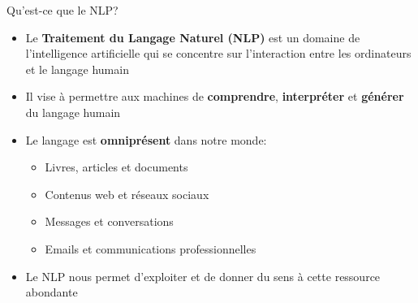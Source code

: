 \documentclass[aspectratio=169,11pt]{beamer}
\begin{document}
\begin{frame}{Qu'est-ce que le NLP?}

    \begin{itemize}
        \item Le \textbf{Traitement du Langage Naturel (NLP)} est un domaine de l'intelligence artificielle qui se concentre sur l'interaction entre les ordinateurs et le langage humain
        \item Il vise à permettre aux machines de \textbf{comprendre}, \textbf{interpréter} et \textbf{générer} du langage humain
        \item Le langage est \textbf{omniprésent} dans notre monde:
        \begin{itemize}
            \item Livres, articles et documents
            \item Contenus web et réseaux sociaux
            \item Messages et conversations
            \item Emails et communications professionnelles
        \end{itemize}
        \item Le NLP nous permet d'exploiter et de donner du sens à cette ressource abondante
    \end{itemize}

\end{frame}
\end{document}
